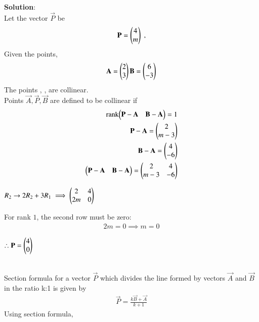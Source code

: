 \documentclass[journal]{IEEEtran}
\begin{document}
\textbf{Solution}:\\
Let the vector $\vec{P}$ be 
\begin{align}
    \vec{P}=\begin{myvec}{4\\m}\end{myvec} \;, 
\end{align}
Given the points,
\begin{align}
    \vec{A}=\begin{myvec}{2\\3}\end{myvec}
    \vec{B}=\begin{myvec}{6\\-3}\end{myvec}
\end{align}
\bigskip
The points , ,  are collinear.\\
Points $\vec{A}, \vec{P}, \vec{B}$ are defined to be collinear if 
		\begin{align}
			\label{eq:line-rank-2}
			\text{rank}{\ensuremath{\begin{pmatrix}\mathbf{P}-\mathbf{A}& \mathbf{B}-\mathbf{A}\end{pmatrix}}} = 1\\
            \mathbf{P}-\mathbf{A} = \begin{pmatrix}2\\m-3\end{pmatrix}\\
            \mathbf{B}-\mathbf{A} = \begin{pmatrix}4\\-6\end{pmatrix}\\
            \begin{pmatrix}\mathbf{P}-\mathbf{A}& \mathbf{B}-\mathbf{A}\end{pmatrix} = \begin{pmatrix}2 & 4\\m-3 & -6\end{pmatrix}
		\end{align}
\begin{center}
$R_2 \rightarrow 2R_2 + 3R_1 \implies \begin{pmatrix}2 & 4\\2m & 0\end{pmatrix}$
\end{center}
For rank $1$, the second row must be zero:
\begin{align}
    2m=0 \implies m=0
\end{align}
\begin{center}
$\therefore \vec{P}=\begin{myvec}{4\\0}\end{myvec}$
\end{center}
\\
Section formula for a vector $\vec{P}$ which divides the line formed by vectors $\vec{A}$ and $\vec{B}$ in the ratio k:1 is given by
\begin{align}
    \vec{P}=\frac{k\vec{B}+\vec{A}}{k+1}
\end{align}
Using section formula,\\
\end{document}
